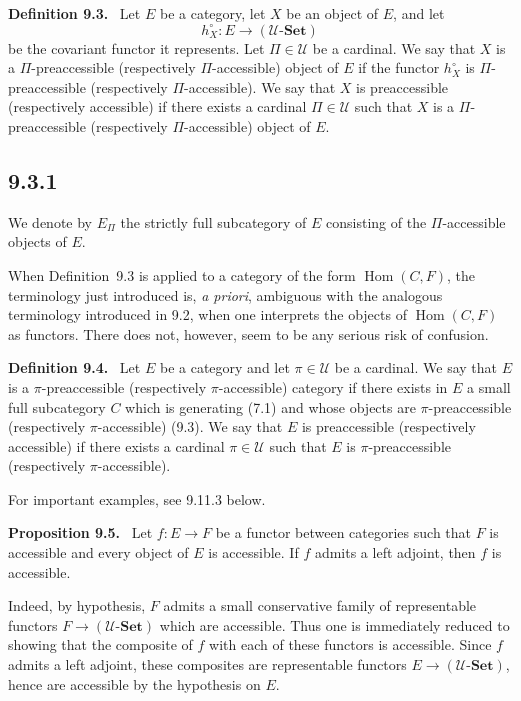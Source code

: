 \documentclass[11pt]{article}
\newcommand{\U}{\mathcal{U}}
\newcommand{\Set}{\mathbf{Set}}
\newcommand{\Hhom}{\operatorname{Hom}}
\newenvironment{statement}[1]{\par\medskip\noindent\textbf{#1.}\ }{\par\medskip}
\begin{document}
\begin{statement}{Definition 9.3}
Let $E$ be a category, let $X$ be an object of $E$, and let
\[
 h_X^\circ:E\longrightarrow (\U\text{-}\Set)
\]
be the covariant functor it represents. Let $\Pi\in\U$ be a cardinal. We say that $X$ is a $\Pi$-preaccessible (respectively $\Pi$-accessible) object of $E$ if the functor $h_X^\circ$ is $\Pi$-preaccessible (respectively $\Pi$-accessible). We say that $X$ is preaccessible (respectively accessible) if there exists a cardinal $\Pi\in\U$ such that $X$ is a $\Pi$-preaccessible (respectively $\Pi$-accessible) object of $E$.
\end{statement}

\subsection*{9.3.1}
We denote by $E_\Pi$ the strictly full subcategory of $E$ consisting of the $\Pi$-accessible objects of $E$.

When Definition~9.3 is applied to a category of the form $\Hhom(C,F)$, the terminology just introduced is, \emph{a priori}, ambiguous with the analogous terminology introduced in 9.2, when one interprets the objects of $\Hhom(C,F)$ as functors. There does not, however, seem to be any serious risk of confusion.

\begin{statement}{Definition 9.4}
Let $E$ be a category and let $\pi\in\U$ be a cardinal. We say that $E$ is a $\pi$-preaccessible (respectively $\pi$-accessible) category if there exists in $E$ a small full subcategory $C$ which is generating (7.1) and whose objects are $\pi$-preaccessible (respectively $\pi$-accessible) (9.3). We say that $E$ is preaccessible (respectively accessible) if there exists a cardinal $\pi\in\U$ such that $E$ is $\pi$-preaccessible (respectively $\pi$-accessible).
\end{statement}

For important examples, see 9.11.3 below.

\begin{statement}{Proposition 9.5}
Let $f:E\to F$ be a functor between categories such that $F$ is accessible and every object of $E$ is accessible. If $f$ admits a left adjoint, then $f$ is accessible.
\end{statement}

Indeed, by hypothesis, $F$ admits a small conservative family of representable functors $F\to(\U\text{-}\Set)$ which are accessible. Thus one is immediately reduced to showing that the composite of $f$ with each of these functors is accessible. Since $f$ admits a left adjoint, these composites are representable functors $E\to(\U\text{-}\Set)$, hence are accessible by the hypothesis on $E$.
\end{document}
